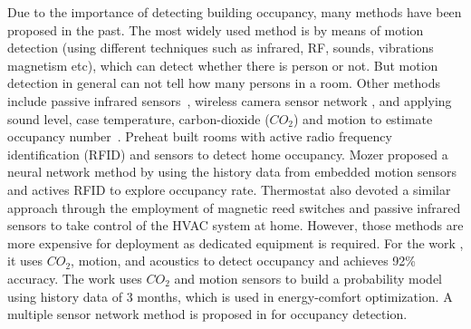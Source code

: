 Due to the importance of detecting building occupancy, many methods
have been proposed in the past. The most widely used method is by
means of motion detection (using different techniques such as infrared,
RF, sounds, vibrations magnetism etc), which can detect whether there is
person or not. But motion detection in general can not tell how many
persons in a room.  Other methods include passive infrared
sensors~\cite{Dodier2006Building}, wireless camera sensor network
\cite{erickson2009energy}, and applying sound level, case temperature,
carbon-dioxide ($CO_2$) and motion to estimate occupancy
number~\cite{Ekwevugbe2013Real}.  Preheat \cite{scott2011ctrl} built
rooms with active radio frequency identification (RFID) and sensors to
detect home occupancy. Mozer \cite{mozer1997neurothermostat} proposed
a neural network method by using the history data from embedded motion
sensors and actives RFID to explore occupancy rate. Thermostat
\cite{lu2010smartthermostat} also devoted a similar approach through
the employment of magnetic reed switches and passive infrared sensors
to take control of the HVAC system at home. However, those methods are
more expensive for deployment as dedicated equipment is required.
For the work \cite{dong2014real}, it uses $CO_2$,
  motion, and acoustics to detect occupancy and achieves 92\%
  accuracy.  The work \cite{majumdar2014energy} uses $CO_2$ and motion
  sensors to build a probability model using history data of 3 months, which is
  used in energy-comfort optimization. A multiple sensor network
  method is proposed in \cite{yang2016review} for occupancy
  detection.


